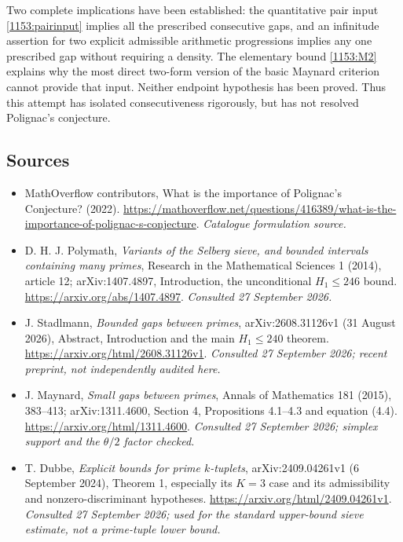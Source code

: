 \documentclass[11pt,a4paper]{article}
\numberwithin{equation}{section}
\begin{document}
Two complete implications have been established: the quantitative pair input
\eqref{1153:pairinput} implies all the prescribed consecutive gaps, and an
infinitude assertion for two explicit admissible arithmetic progressions
implies any one prescribed gap without requiring a density. The elementary
bound \eqref{1153:M2} explains why the most direct two-form version of the
basic Maynard criterion cannot provide that input. Neither endpoint
hypothesis has been proved. Thus this attempt has isolated consecutiveness
rigorously, but has not resolved Polignac's conjecture.
\subsection{Sources}
\begin{itemize}\raggedright
\item[\textnormal{[S1]}]\hypertarget{source:1153:1}{} MathOverflow contributors, What is the importance of Polignac's Conjecture? (2022).
\url{https://mathoverflow.net/questions/416389/what-is-the-importance-of-polignac-s-conjecture}.
{\small\textit{Catalogue formulation source.}}
\item[\textnormal{[E1]}]\hypertarget{extra:1153:1}{} D. H. J. Polymath,
\emph{Variants of the Selberg sieve, and bounded intervals containing many
primes}, Research in the Mathematical Sciences 1 (2014), article 12;
arXiv:1407.4897, Introduction, the unconditional $H_1\leq246$ bound.
\url{https://arxiv.org/abs/1407.4897}.
{\small\textit{Consulted 27 September 2026.}}
\item[\textnormal{[E2]}]\hypertarget{extra:1153:2}{} J. Stadlmann,
\emph{Bounded gaps between primes}, arXiv:2608.31126v1
(31 August 2026), Abstract, Introduction and the main $H_1\leq240$ theorem.
\url{https://arxiv.org/html/2608.31126v1}.
{\small\textit{Consulted 27 September 2026; recent preprint, not independently audited here.}}
\item[\textnormal{[E3]}]\hypertarget{extra:1153:3}{} J. Maynard,
\emph{Small gaps between primes}, Annals of Mathematics 181 (2015), 383--413;
arXiv:1311.4600, Section 4, Propositions 4.1--4.3 and equation (4.4).
\url{https://arxiv.org/html/1311.4600}.
{\small\textit{Consulted 27 September 2026; simplex support and the $\theta/2$ factor checked.}}
\item[\textnormal{[E4]}]\hypertarget{extra:1153:4}{} T. Dubbe,
\emph{Explicit bounds for prime $k$-tuplets}, arXiv:2409.04261v1
(6 September 2024), Theorem 1, especially its $K=3$ case and its
admissibility and nonzero-discriminant hypotheses.
\url{https://arxiv.org/html/2409.04261v1}.
{\small\textit{Consulted 27 September 2026; used for the standard upper-bound sieve estimate, not a prime-tuple lower bound.}}
\end{itemize}
\end{document}
